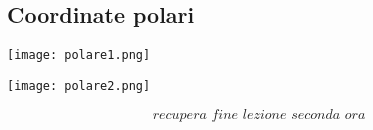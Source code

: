 \documentclass[../../main.tex]{subfiles}
\begin{document}
\subsection*{Coordinate polari}
\begin{minipage}{0.5\textwidth}
    \centering
    \texttt{[image: polare1.png]}
\end{minipage}
\begin{minipage}{0.5\textwidth}
    \centering
    \texttt{[image: polare2.png]}
\end{minipage}

\[
    \textit{ recupera fine lezione seconda ora }
\]
\end{document}
